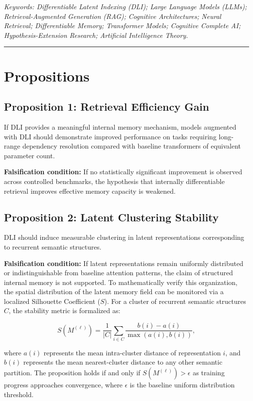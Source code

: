 \noindent \textit{Keywords: Differentiable Latent Indexing (DLI); Large Language Models (LLMs); Retrieval-Augmented Generation (RAG); Cognitive Architectures; Neural Retrieval; Differentiable Memory; Transformer Models; Cognitive Complete AI; Hypothesis-Extension Research; Artificial Intelligence Theory.}

\vspace{2em}
\hrule
\vspace{2em}

\chapter{Propositions}

\section*{Proposition 1: Retrieval Efficiency Gain}
If DLI provides a meaningful internal memory mechanism, models augmented with DLI should demonstrate improved performance on tasks requiring long-range dependency resolution compared with baseline transformers of equivalent parameter count.

\textbf{Falsification condition:} If no statistically significant improvement is observed across controlled benchmarks, the hypothesis that internally differentiable retrieval improves effective memory capacity is weakened.

\section*{Proposition 2: Latent Clustering Stability}
DLI should induce measurable clustering in latent representations corresponding to recurrent semantic structures.

\textbf{Falsification condition:} If latent representations remain uniformly distributed or indistinguishable from baseline attention patterns, the claim of structured internal memory is not supported. To mathematically verify this organization, the spatial distribution of the latent memory field can be monitored via a localized Silhouette Coefficient ($S$). For a cluster of recurrent semantic structures $C$, the stability metric is formalized as:

\begin{equation}
S(M^{(\ell)}) = \frac{1}{|C|} \sum_{i \in C} \frac{b(i) - a(i)}{\max(a(i), b(i))},
\end{equation}

where $a(i)$ represents the mean intra-cluster distance of representation $i$, and $b(i)$ represents the mean nearest-cluster distance to any other semantic partition. The proposition holds if and only if $S(M^{(\ell)}) > \epsilon$ as training progress approaches convergence, where $\epsilon$ is the baseline uniform distribution threshold.

